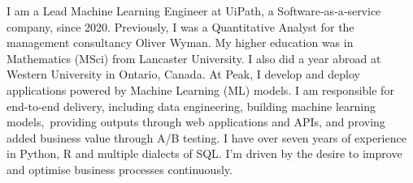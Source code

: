 \documentclass[12pt, a4paper]{awesome-cv}
\begin{document}
\makecvheader[C]


\begin{cvparagraph}

I am a Lead Machine Learning Engineer at UiPath, a Software‑as‑a‑service company, since 2020. Previously, I was a Quantitative Analyst
for the management consultancy Oliver Wyman. My higher education was in Mathematics (MSci) from Lancaster University. I also
did a year abroad at Western University in Ontario, Canada.
\newline \newline
At Peak, I develop and deploy applications powered by Machine Learning (ML) models. I am responsible for end-to-end delivery,
including data engineering, building machine learning models, providing outputs through web applications and APIs, and proving added business value through A/B testing.
I have over seven years of experience in Python, R and multiple dialects of SQL. I'm driven by the desire to improve and optimise business processes continuously.
\end{cvparagraph}
\end{document}
